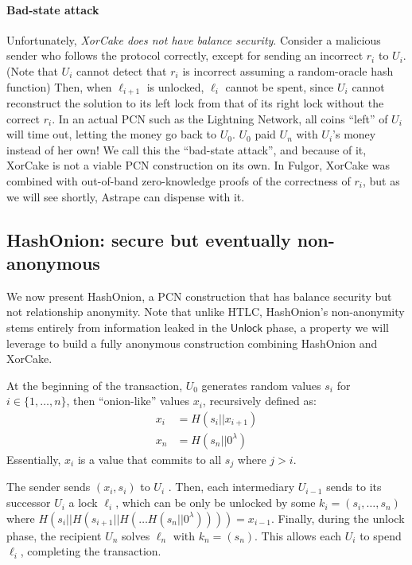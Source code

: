 \documentclass[USenglish,oneside,twocolumn]{article}
\begin{document}
\paragraph*{Bad-state attack} Unfortunately, \emph{XorCake does not have balance security}. Consider a malicious sender who follows the protocol correctly, except for sending an incorrect $r_i$ to $U_i$. (Note that $U_i$ cannot detect that $r_i$ is incorrect assuming a random-oracle hash function) Then, when $\ell_{i+1}$ is unlocked, $\ell_{i}$ cannot be spent, since $U_i$ cannot reconstruct the solution to its left lock from that of its right lock without the correct $r_i$. In an actual PCN such as the Lightning Network, all coins ``left'' of $U_i$ will time out, letting the money go back to $U_0$. $U_0$ paid $U_n$ with $U_i$'s money instead of her own! We call this the ``bad-state attack'', and because of it, XorCake is not a viable PCN construction on its own. In Fulgor, XorCake was combined with out-of-band zero-knowledge proofs of the correctness of $r_i$, but as we will see shortly, Astrape can dispense with it.

\subsection{HashOnion: secure but eventually non-anonymous}

We now present HashOnion, a PCN construction that has balance security but not relationship anonymity. Note that unlike HTLC, HashOnion's non-anonymity stems entirely from information leaked in the $\mathsf{Unlock}$ phase, a property we will leverage to build a fully anonymous construction combining HashOnion and XorCake.

At the beginning of the transaction, $U_0$ generates random values $s_i$ for $i\in \{1,\dots,n\}$, then ``onion-like'' values $x_i$, recursively defined as:
\begin{align*}
    x_i & = H(s_i||x_{i+1})     \\
    x_n & = H(s_n || 0^\lambda)
\end{align*}
Essentially, $x_i$ is a value that commits to all $s_j$ where $j>i$.

The sender sends $(x_i, s_i)$ to $U_i$ . Then, each intermediary $U_{i-1}$ sends to its successor $U_i$ a lock $\ell_i$, which can be only be unlocked by some $k_i = (s_i, \dots, s_n)$ where $H(s_i||H(s_{i+1}||H( \dots H(s_n || 0^\lambda) ))) = x_{i-1}$. Finally, during the unlock phase, the recipient $U_n$ solves $\ell_n$ with $k_n = (s_n)$. This allows each $U_i$ to spend $\ell_i$, completing the transaction.
\end{document}
